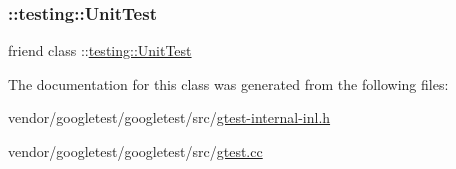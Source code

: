 \subsubsection{\texorpdfstring{\+::testing\+::\+Unit\+Test}{::testing::UnitTest}}
{\footnotesize\ttfamily friend class \+::\hyperlink{classtesting_1_1_unit_test}{testing\+::\+Unit\+Test}\hspace{0.3cm}{\ttfamily [friend]}}



The documentation for this class was generated from the following files\+:\begin{DoxyCompactItemize}
\item 
vendor/googletest/googletest/src/\hyperlink{gtest-internal-inl_8h}{gtest-\/internal-\/inl.\+h}\item 
vendor/googletest/googletest/src/\hyperlink{gtest_8cc}{gtest.\+cc}\end{DoxyCompactItemize}
